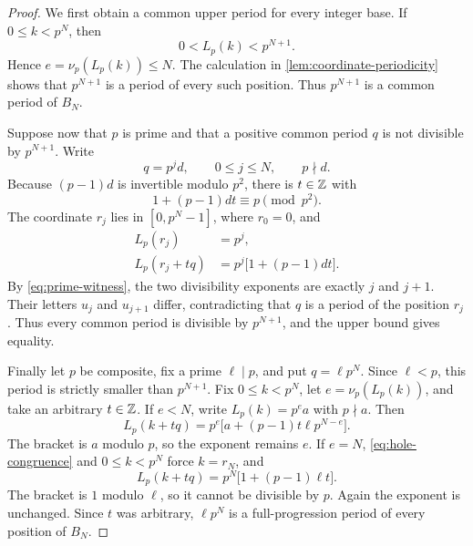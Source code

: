 \begin{proof}
  We first obtain a common upper period for every integer base.  If
  $0\leq k<p^N$, then
  \[
    0<L_p(k)<p^{N+1}.
  \]
  Hence $e=\nu_p(L_p(k))\leq N$.  The calculation in
  \cref{lem:coordinate-periodicity} shows that $p^{N+1}$ is a period of
  every such position.  Thus $p^{N+1}$ is a common period of $B_N$.

  Suppose now that $p$ is prime and that a positive common period $q$ is
  not divisible by $p^{N+1}$.  Write
  \begin{equation}
    q=p^j d,\qquad 0\leq j\leq N,\qquad p\nmid d.
    \label{eq:prime-period-decomposition}
  \end{equation}
  Because $(p-1)d$ is invertible modulo $p^2$, there is $t\in\mathbb Z$ with
  \begin{equation}
    1+(p-1)dt\equiv p\pmod {p^2}.
    \label{eq:prime-witness}
  \end{equation}
  The coordinate $r_j$ lies in $[0,p^N-1]$, where $r_0=0$, and
  \begin{align*}
    L_p(r_j)&=p^j,\\
    L_p(r_j+tq)&=p^j\bigl[1+(p-1)dt\bigr].
  \end{align*}
  By \cref{eq:prime-witness}, the two divisibility exponents are exactly
  $j$ and $j+1$.  Their letters $u_j$ and $u_{j+1}$ differ, contradicting
  that $q$ is a period of the position $r_j$.  Thus every common period is
  divisible by $p^{N+1}$, and the upper bound gives equality.

  Finally let $p$ be composite, fix a prime $\ell\mid p$, and put
  $q=\ell p^N$.  Since $\ell<p$, this period is strictly smaller than
  $p^{N+1}$.  Fix $0\leq k<p^N$, let
  $e=\nu_p(L_p(k))$, and take an arbitrary $t\in\mathbb Z$.  If $e<N$, write
  $L_p(k)=p^e a$ with $p\nmid a$.  Then
  \begin{equation}
    L_p(k+tq)
       =p^e\bigl[a+(p-1)t\ell p^{N-e}\bigr].
    \label{eq:composite-low}
  \end{equation}
  The bracket is $a$ modulo $p$, so the exponent remains $e$.  If $e=N$,
  \cref{eq:hole-congruence} and $0\leq k<p^N$ force $k=r_N$, and
  \begin{equation}
    L_p(k+tq)=p^N\bigl[1+(p-1)\ell t\bigr].
    \label{eq:composite-top}
  \end{equation}
  The bracket is $1$ modulo $\ell$, so it cannot be divisible by $p$.
  Again the exponent is unchanged.  Since $t$ was arbitrary,
  $\ell p^N$ is a full-progression period of every position of $B_N$.
\end{proof}

